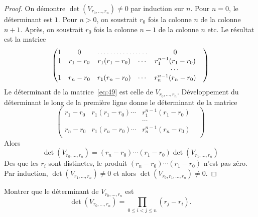 \begin{proof}
   On démontre  $\det(V_{r_0,\dots,r_n}) ≠0$ par induction sur $n$. Pour $n = 0$, le déterminant est $1$. Pour $n>0$, on soustrait $r_0$ fois la colonne $n$ de la colonne $n+1$. Après, on soustrait $r_0$ fois la colonne $n-1$ de la colonne $n$ etc. Le résultat est la matrice
   \begin{equation}
     \label{eq:49}
     \begin{pmatrix}
       1 & 0  &      \hdotsfor{2} &  0 \\
       1 & r_1- r_0&  r_1 (r_1-r_0)  & \cdots & r_1^{n-1} (r_1 - r_0) \\
       & & &  & \cdots  &  \\
       1 & r_n -r_0&  r_1 (r_n-r_0) & \cdots & r_n^{n-1} (r_n - r_0) \\
     \end{pmatrix}
   \end{equation}
   Le déterminant de la matrice~\eqref{eq:49} est celle de
   $V_{r_0,\dots,r_n}$. Développement du déterminant le long de la
   première ligne donne le déterminant de la matrice
 \begin{equation}
\label{eq:50}
    \begin{pmatrix}
       r_1- r_0&  r_1 (r_1-r_0) \cdots & r_1^{n-1} (r_1 - r_0) \\
        & &  \cdots  &  \\
        r_n -r_0&  r_1 (r_n-r_0) \cdots & r_n^{n-1} (r_n - r_0) \\
     \end{pmatrix}
   \end{equation}
   Alors
   \begin{displaymath}
     \det(V_{r_0,\dots,r_n})  = (r_n-r_0) \cdots (r_1-r_0)  \det(V_{r_1,\dots,r_n})
   \end{displaymath}      
Des que les $r_i$ sont distinctes, le produit   $(r_n-r_0) \cdots (r_1-r_0) $ n'est pas zéro. Par induction, $\det(V_{r_1,\dots,r_n}) ≠0$ et alors $\det(V_{r_0,r_1,\dots,r_n}) ≠0$.  
\end{proof}

\begin{exercise}
  \label{exe:37}
  Montrer que le déterminant de $V_{r_0,\dots,r_n}$ est
  \begin{displaymath}
    \det (V_{r_0,\dots,r_n}) = ∏_{0 ≤ i<j ≤n} (r_j - r_i). 
  \end{displaymath}
\end{exercise}



